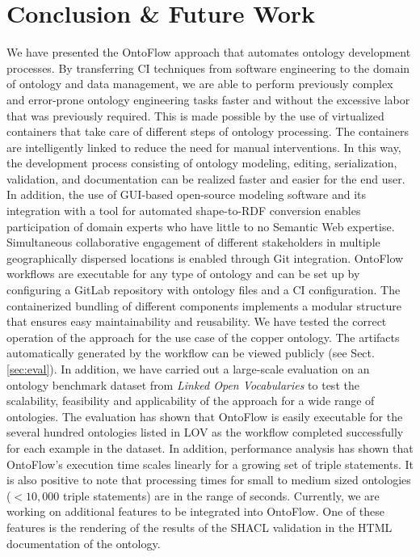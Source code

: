 \documentclass[runningheads]{llncs}
\begin{document}
\section{Conclusion \& Future Work}
\label{sec:final}
We have presented the OntoFlow approach that automates ontology development processes. By transferring CI techniques from software engineering to the domain of ontology and data management, we are able to perform previously complex and error-prone ontology engineering tasks faster and without the excessive labor that was previously required. This is made possible by the use of virtualized containers that take care of different steps of ontology processing. The containers are intelligently linked to reduce the need for manual interventions. In this way, the development process consisting of ontology modeling, editing, serialization, validation, and documentation can be realized faster and easier for the end user. In addition, the use of GUI-based open-source modeling software and its integration with a tool for automated shape-to-RDF conversion enables participation of domain experts who have little to no Semantic Web expertise. Simultaneous collaborative engagement of different stakeholders in multiple geographically dispersed locations is enabled through Git integration. OntoFlow workflows are executable for any type of ontology and can be set up by configuring a GitLab repository with ontology files and a CI configuration. The containerized bundling of different components implements a modular structure that ensures easy maintainability and reusability. We have tested the correct operation of the approach for the use case of the copper ontology. The artifacts automatically generated by the workflow can be viewed publicly (see Sect. \ref{sec:eval}). In addition, we have carried out a large-scale evaluation on an ontology benchmark dataset from \textit{Linked Open Vocabularies} to test the scalability, feasibility and applicability of the approach for a wide range of ontologies. The evaluation has shown that OntoFlow is easily executable for the several hundred ontologies listed in LOV as the workflow completed successfully for each example in the dataset. In addition, performance analysis has shown that OntoFlow's execution time scales linearly for a growing set of triple statements. It is also positive to note that processing times for small to medium sized ontologies ($< 10,000$ triple statements) are in the range of seconds. Currently, we are working on additional features to be integrated into OntoFlow. One of these features is the rendering of the results of the SHACL validation in the HTML documentation of the ontology.
\end{document}
